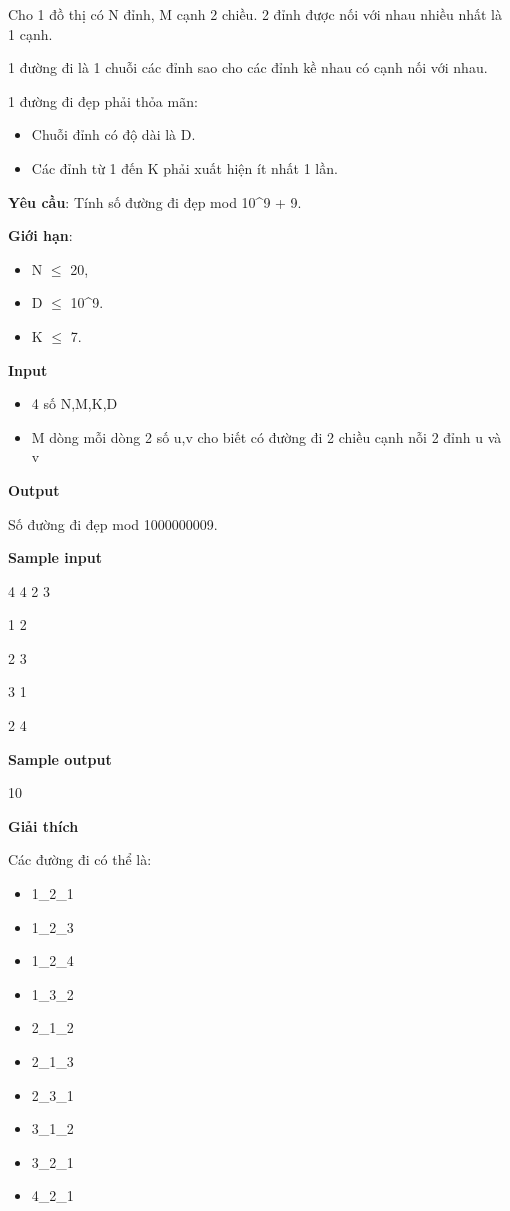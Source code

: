

Cho 1 đồ thị có N đỉnh, M cạnh 2 chiều. 2 đỉnh được nối với nhau nhiều nhất là 1 cạnh.

1 đường đi là 1 chuỗi các đỉnh sao cho các đỉnh kề nhau có cạnh nối với nhau.

1 đường đi đẹp phải thỏa mãn:
\begin{itemize}
	\item Chuỗi đỉnh có độ dài là D.
	\item Các đỉnh từ 1 đến K phải xuất hiện ít nhất 1 lần.
\end{itemize}

\textbf{Yêu cầu}: Tính số đường đi đẹp mod 10^9 + 9.

\textbf{Giới hạn}:
\begin{itemize}
	\item N  $\le$  20,
	\item D  $\le$  10^9.
	\item K  $\le$  7.
\end{itemize}

\textbf{Input}
\begin{itemize}
	\item 4 số N,M,K,D
	\item M dòng mỗi dòng 2 số u,v cho biết có đường đi 2 chiều cạnh nỗi 2 đỉnh u và v
\end{itemize}

\textbf{Output}

Số đường đi đẹp mod 1000000009.

\textbf{Sample input}

4 4 2 3

1 2

2 3

3 1

2 4

\textbf{Sample output}

10

\textbf{Giải thích}

Các đường đi có thể là:
\begin{itemize}
	\item 1\_2\_1
	\item 1\_2\_3
	\item 1\_2\_4
	\item 1\_3\_2
	\item 2\_1\_2
	\item 2\_1\_3
	\item 2\_3\_1
	\item 3\_1\_2
	\item 3\_2\_1
	\item 4\_2\_1
\end{itemize}

 

 

 

 
